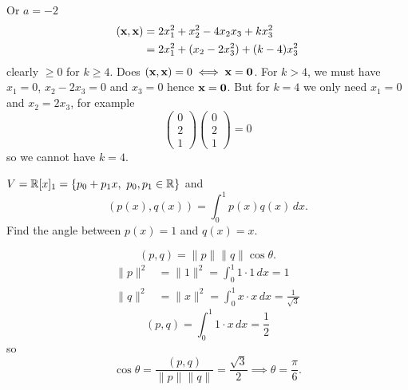 \documentclass[10pt, a4paper]{article}
\begin{document}
\begin{problem}
\begin{solution}
        Or
        $a = -2$
        \begin{align*}
            (\mathbf{x}, \mathbf{x}) &= 2x_1 ^ 2 + x_2 ^ 2 - 4x_2x_3 + kx_3 ^ 2 \\
            &= 2x_1 ^ 2 + (x_2 - 2x_3 ^ 2) + (k - 4)x_3 ^ 2
        \end{align*}
        clearly $\geq 0$ for $k \geq 4$.
        Does $(\mathbf{x}, \mathbf{x}) = 0 \iff \mathbf{x} = \mathbf{0}$.
        For $k > 4$,
        we must have $x_1 = 0$,
        $x_2 - 2x_3 = 0$ and $x_3 = 0$ hence $\mathbf{x} = \mathbf{0}$.
        But for $k = 4$ we only need $x_1 = 0$ and $x_2 = 2x_3$,
        for example
        \[
        \begin{pmatrix}
            0 \\ 2 \\ 1
        \end{pmatrix}
        \begin{pmatrix}
            0 \\ 2 \\ 1
        \end{pmatrix} = 0
        \]
        so we cannot have $k = 4$.
    \end{solution}
\end{problem}

\begin{problem}
    $V = \mathbb{R}[x]_1 = \{p_0 + p_1x,\ p_0, p_1 \in \mathbb{R}\}$ and
    \[
    (p(x), q(x)) = \int_{0}^{1}p(x)q(x)\,dx.
    \]
    Find the angle between $p(x) = 1$ and $q(x) = x$.
    
    \begin{solution}
        \[
        (p, q) = \|p\|\|q\|\cos{\theta}.
        \]
        \begin{align*}
            \|p\| ^ 2 &= \|1\| ^ 2 = \int_{0}^{1}1\cdot 1\,dx = 1 \\
            \|q\| ^ 2 &= \|x\| ^ 2 = \int_{0}^{1}x\cdot x\,dx = \frac{1}{\sqrt{3}}
        \end{align*}
        \[
        (p, q) = \int_{0}^{1}1\cdot x\,dx = \frac{1}{2}
        \]
        so
        \[
        \cos{\theta} = \frac{(p, q)}{\|p\|\|q\|} = \frac{\sqrt{3}}{2} \implies \theta = \frac{\pi}{6}.
        \]
    \end{solution}
\end{problem}
\end{document}
